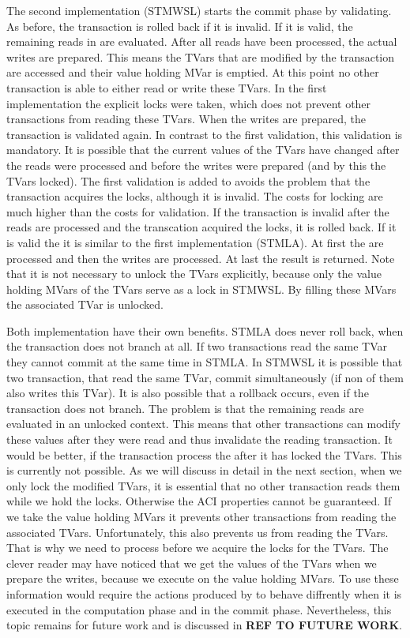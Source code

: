 The second implementation (STMWSL) starts the commit phase by validating. As before, the 
transaction is rolled back if it is invalid. If it is valid, the remaining reads in 
 are evaluated. After all reads have been processed, the actual writes are
prepared. This means the TVars that are modified by the transaction are accessed and
their value holding MVar is emptied. At this point no other transaction is able to 
either read or write these TVars. In the first implementation the explicit locks 
were taken, which does not prevent other transactions from reading these TVars.
When the writes are prepared, the transaction is validated again. In contrast to 
the first validation, this validation is mandatory. It is possible that the current
values of the TVars have changed after the reads were processed and before the 
writes were prepared (and by this the TVars locked). The first validation is
added to avoids the problem that the transaction acquires the locks, although it 
is invalid. The costs for locking are much higher than the costs for validation.
If the transaction is invalid after the reads are processed and the transcation
acquired the locks, it is rolled back. If it is valid the it is similar to
the first implementation (STMLA). At first the  are processed
and then the writes are processed. At last the result is returned. Note that
it is not necessary to unlock the TVars explicitly, because only the value 
holding MVars of the TVars serve as a lock in STMWSL. By filling these MVars
the associated TVar is unlocked. 

Both implementation have their own benefits. STMLA does never roll back,
when the transaction does not branch at all. If two transactions read the
same TVar they cannot commit at the same time in STMLA. In STMWSL it is
possible that two transaction, that read the same TVar, commit simultaneously
(if non of them also writes this TVar). It is also possible
that a rollback occurs, even if the transaction does not branch. The 
problem is that the remaining reads are evaluated in an unlocked context.
This means that other transactions can modify these values after they were 
read and thus invalidate the reading transaction. It would be better, if the
transaction process the  after it has locked the TVars. This is 
currently not possible. As we will discuss in detail in the next section, when 
we only lock the modified TVars, it is essential that no other transaction 
reads them while we hold the locks. Otherwise the ACI properties cannot be 
guaranteed. If we take the value holding MVars it prevents other transactions
from reading the associated TVars. Unfortunately, this also prevents us from 
reading the TVars. That is why we need to process  before we 
acquire the locks for the TVars. The clever reader may have noticed that 
we get the values of the TVars when we prepare the writes, because we execute
 on the value holding MVars. To use these information would 
require the  actions produced by  to 
behave diffrently when it is executed in the computation phase and in the 
commit phase. Nevertheless, this topic remains for future work and is discussed 
in \textbf{REF TO FUTURE WORK}.

